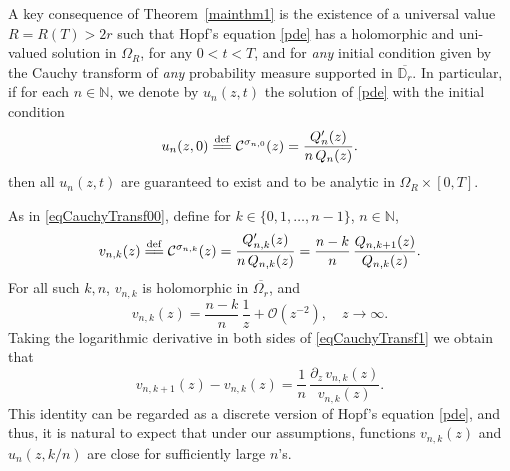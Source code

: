 \documentclass[reqno,11pt]{amsart}
\theoremstyle{plain}
\theoremstyle{definition}
\theoremstyle{remark}
\numberwithin{equation}{section}
\numberwithin{equation}{section}
\newcommand{\N}{\mathbb{N}}
\newcommand{\D}{\mathbb{D}}
\newcommand{\isdef}{\overset{\mathrm{def}}{=\joinrel=}}
\begin{document}
A key consequence of Theorem~\ref{mainthm1} is the existence of a universal value $R=R(T)>2r$ such that Hopf's equation \eqref{pde} has a holomorphic and uni-valued solution in $\Omega_R$, for any $0<t<T$, and for \textit{any} initial condition given by the Cauchy transform of \textit{any} probability measure supported in $\overline{\D_r}$. In particular, if for each $n\in \N$, we denote by $u_n(z,t)$ the solution of \eqref{pde} with the initial condition 
\begin{equation}
    \label{initialCondiU_n}
    u_n(z,0)\isdef \mathcal C^{\sigma_{n,0}}(z) =  \frac{  Q'_{n }(z)}{n\, Q_{n }(z)}. 
\end{equation}
then all $u_n(z,t)$ are guaranteed to exist and to be analytic in $\Omega_R \times [0,T]$.

As in \eqref{eqCauchyTransf00}, define for $k\in \{0, 1,\dots, n-1\}$, $n\in \N$,
\begin{equation} \label{eqCauchyTransf1}
v_{n,k} (z)\isdef	\mathcal C^{\sigma_{n,k}}(z)=	\frac{  Q'_{n,k}(z)}{n\, Q_{n,k}(z)} = \frac{n-k}{n} \, \frac{ Q_{n,k+1}(z)}{ Q_{n,k}(z)}  .
\end{equation}
For all such $k, n$, $v_{n,k} $ is holomorphic in $\overline{\Omega_r}$, and
\begin{equation}
    \label{estimateatinftyvnk}
v_{n,k} (z) = \frac{n-k}{n  }\, \frac{1}{  z } + \mathcal O(z^{-2}), \quad z\to \infty.
\end{equation}
Taking the logarithmic derivative in both sides of \eqref{eqCauchyTransf1} we obtain that
\begin{equation} \label{eqCauchyTransfNew}
	v_{n,k+1}(z)- v_{n,k}(z) =\frac{1}{n}\, \frac{\partial_z\, v_{n,k}(z)}{  v_{n,k}(z)}. 
\end{equation}
This identity can be regarded as a discrete version of Hopf's equation \eqref{pde}, and thus, it is natural to expect that under our assumptions, functions $v_{n,k}(z)$ and $u_n(z,k/n)$ are close for sufficiently large $n$'s.
\end{document}
